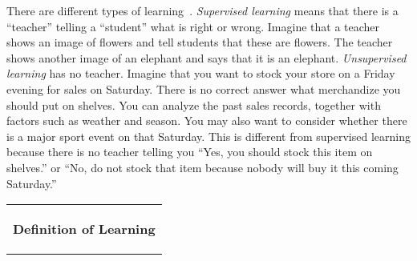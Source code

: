

There are different types of
learning~\cite{Goodfellow2016DeepLearning}.  {\it Supervised learning}
means that there is a ``teacher'' telling a ``student'' what is right
or wrong. Imagine that a teacher shows an image of flowers and tell
students that these are flowers. The teacher shows another image of an
elephant and says that it is an elephant.  {\it Unsupervised learning}
has no teacher. Imagine that you want to stock your store on a Friday
evening for sales on Saturday.  There is no correct answer what
merchandize you should put on shelves.  You can analyze the past sales
records, together with factors such as weather and season.  You may
also want to consider whether there is a major sport event on that
Saturday.  This is different from supervised learning because there is
no teacher telling you ``Yes, you should stock this item on shelves.''
or ``No, do not stock that item because nobody will buy it this coming
Saturday.''

\begin{comment}
http://incompleteideas.net/book/bookdraft2017nov5.pdf
Reinforcement Learning: An Introduction
Richard S. Sutton and Andrew G. Barto
\end{comment}

\vspace{0.1in}\begin{tabular}{p{5in}}
\index{definition of learning}
  \begin{center}
    {\bf Definition of Learning}
 \end{center}


\end{tabular}\vspace{0.1in}
